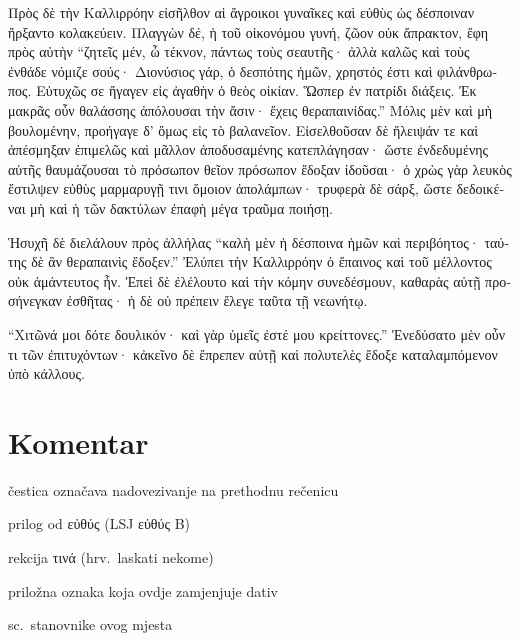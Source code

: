 {\large

\begin{greek}

\noindent Πρὸς δὲ τὴν Καλλιρρόην εἰσῆλθον αἱ ἄγροικοι γυναῖκες καὶ εὐθὺς ὡς δέσποιναν ἤρξαντο κολακεύειν. Πλαγγὼν δέ, ἡ τοῦ οἰκονόμου γυνή, ζῶον οὐκ ἄπρακτον, ἔφη πρὸς αὐτὴν ``ζητεῖς μέν, ὦ τέκνον, πάντως τοὺς σεαυτῆς· ἀλλὰ καλῶς καὶ τοὺς ἐνθάδε νόμιζε σούς· Διονύσιος γάρ, ὁ δεσπότης ἡμῶν, χρηστός ἐστι καὶ φιλάνθρωπος. Εὐτυχῶς σε ἤγαγεν εἰς ἀγαθὴν ὁ θεὸς οἰκίαν. Ὥσπερ ἐν πατρίδι διάξεις. Ἐκ μακρᾶς οὖν θαλάσσης ἀπόλουσαι τὴν ἄσιν· ἔχεις θεραπαινίδας.'' Μόλις μὲν καὶ μὴ βουλομένην, προήγαγε δ' ὅμως εἰς τὸ βαλανεῖον. Εἰσελθοῦσαν δὲ ἤλειψάν τε καὶ ἀπέσμηξαν ἐπιμελῶς καὶ μᾶλλον ἀποδυσαμένης κατεπλάγησαν· ὥστε ἐνδεδυμένης αὐτῆς θαυμάζουσαι τὸ πρόσωπον θεῖον πρόσωπον ἔδοξαν ἰδοῦσαι· ὁ χρὼς γὰρ λευκὸς ἔστιλψεν εὐθὺς μαρμαρυγῇ τινι ὅμοιον ἀπολάμπων· τρυφερὰ δὲ σάρξ, ὥστε δεδοικέναι μὴ καὶ ἡ τῶν δακτύλων ἐπαφὴ μέγα τραῦμα ποιήσῃ.

\noindent Ἡσυχῆ δὲ διελάλουν πρὸς ἀλλήλας ``καλὴ μὲν ἡ δέσποινα ἡμῶν καὶ περιβόητος· ταύτης δὲ ἂν θεραπαινὶς ἔδοξεν.'' Ἐλύπει τὴν Καλλιρρόην ὁ ἔπαινος καὶ τοῦ μέλλοντος οὐκ ἀμάντευτος ἦν. Ἐπεὶ δὲ ἐλέλουτο καὶ τὴν κόμην συνεδέσμουν, καθαρὰς αὐτῇ προσήνεγκαν ἐσθῆτας· ἡ δὲ οὐ πρέπειν ἔλεγε ταῦτα τῇ νεωνήτῳ.

\noindent ``Χιτῶνά μοι δότε δουλικόν· καὶ γὰρ ὑμεῖς ἐστέ μου κρείττονες.'' Ἐνεδύσατο μὲν οὖν τι τῶν ἐπιτυχόντων· κἀκεῖνο δὲ ἔπρεπεν αὐτῇ καὶ πολυτελὲς ἔδοξε καταλαμπόμενον ὑπὸ κάλλους.


\end{greek}

}


\section*{Komentar}


\begin{description}[noitemsep]
\item[δὲ] čestica označava nadovezivanje na prethodnu rečenicu
\item[εὐθὺς] prilog od εὐθύς (LSJ εὐθύς B)
\item[κολακεύειν] rekcija τινά (hrv.\ laskati nekome)

\end{description}

\begin{description}[noitemsep]
\item[πρὸς αὐτὴν] priložna oznaka koja ovdje zamjenjuje dativ 
\item[καὶ ἐνθάδε] sc.\ stanovnike ovog mjesta
\end{description}


